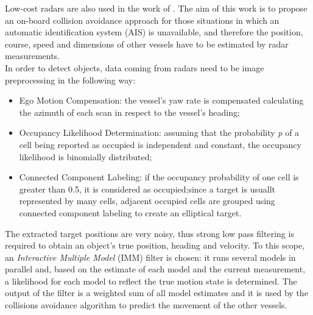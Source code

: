 \documentclass[12pt]{article}
\begin{document}
      \indent Low-cost radars are also used in the work of \textcite{Schuster2014}. The aim of this work is to propose an on-board collision avoidance approach for those situations in which an automatic identification system (AIS) is unavailable, and therefore the position, course, speed and dimensions of other vessels have to be estimated by radar measurements.\\
      \indent In order to detect objects, data coming from radars need to be image preprocessing in the following way:
            \begin{itemize}
                  \item Ego Motion Compensation: the vessel's yaw rate is compensated calculating the azimuth of each scan in respect to the vessel's heading;
                  \item Occupancy Likelihood Determination: assuming that the probability \textit{p} of a cell being reported as occupied is independent and constant, the occupancy likelihood is binomially distributed;
                  \item Connected Component Labeling: if the occupancy probability of one cell is greater than 0.5, it is considered as occupied;since a target is usuallt represented by many cells, adjacent occupied cells are grouped using connected component labeling \parencite{Gonzalez:2001:DIP:559707} to create an elliptical target.
            \end{itemize}
      The extracted target positions are very noisy, thus strong low pass filtering is required to obtain an object's true position, heading and velocity. To this scope, an \textit{Interactive Multiple Model} (IMM) filter is chosen: it runs several models in parallel and, based on the estimate of each model and the current measurement, a likelihood for each model to reflect the true motion state is determined. The output of the filter is a weighted sum of all model estimates and it is used by the collisions avoidance algorithm to predict the movement of the other vessels.
\end{document}
